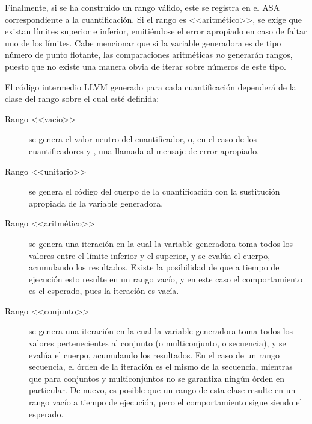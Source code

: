{{Finalmente, si se ha construido un rango válido, este se registra en el ASA
correspondiente a la cuantificación. Si el rango es <<aritmético>>, se exige que
existan límites superior e inferior, emitiéndose el error apropiado en caso de
faltar uno de los límites. Cabe mencionar que si la variable generadora es de
tipo número de punto flotante, las comparaciones aritméticas \emph{no} generarán
rangos, puesto que no existe una manera obvia de iterar sobre números de este
tipo.

El código intermedio LLVM generado para cada cuantificación dependerá de la
clase del rango sobre el cual esté definida:

\begin{description}

  \item [Rango <<vacío>>] se genera el valor neutro del cuantificador, o, en el
caso de los cuantificadores  y , una llamada al mensaje
de error apropiado.

  \item [Rango <<unitario>>] se genera el código del cuerpo de la cuantificación
con la sustitución apropiada de la variable generadora.

  \item [Rango <<aritmético>>] se genera una iteración en la cual la variable
generadora toma todos los valores entre el límite inferior y el superior, y se
evalúa el cuerpo, acumulando los resultados. Existe la posibilidad de que a
tiempo de ejecución esto resulte en un rango vacío, y en este caso el
comportamiento es el esperado, pues la iteración es vacía.

  \item [Rango <<conjunto>>] se genera una iteración en la cual la variable
generadora toma todos los valores pertenecientes al conjunto (o multiconjunto,
o secuencia), y se evalúa el cuerpo, acumulando los resultados. En el caso de un
rango secuencia, el órden de la iteración es el mismo de la secuencia, mientras
que para conjuntos y multiconjuntos no se garantiza ningún órden en particular.
De nuevo, es posible que un rango de esta clase resulte en un rango vacío a
tiempo de ejecución, pero el comportamiento sigue siendo el esperado.

\end{description}

}}

